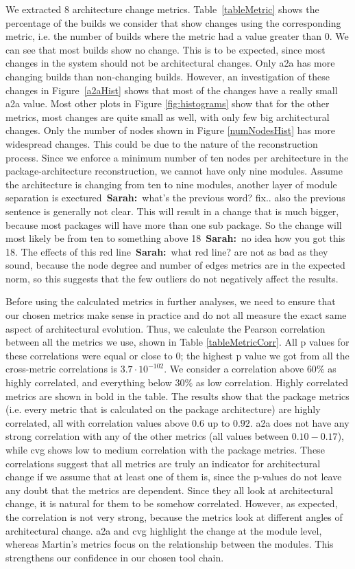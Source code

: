 \documentclass[sigplan, anonymous, review]{acmart}
\newcommand{\sn}[1]{{\color{blue}\textbf{Sarah:}~#1}}
\begin{document}
We extracted 8 architecture change metrics. 
Table~\ref{tableMetric} shows the percentage of the builds we consider that show changes using the corresponding metric, i.e. the number of builds where the metric had a value greater than 0.
We can see that most builds show no change.
This is to be expected, since most changes in the system should not be architectural changes. 
Only a2a has more changing builds than non-changing builds. 
However, an investigation of these changes in Figure~\ref{a2aHist} shows that most of the changes have a really small a2a value. 
Most other plots in Figure \ref{fig:histograms} show that for the other metrics, most changes are quite small as well, with only few big architectural changes. 
Only the number of nodes shown in Figure \ref{numNodesHist} has more widespread changes.
This could be due to the nature of the reconstruction process. Since we enforce a minimum number of ten nodes per architecture in the package-architecture reconstruction, we cannot have only nine modules. Assume the architecture is changing from ten to nine modules, another layer of module separation is exectured~\sn{what's the previous word? fix.. also the previous sentence is generally not clear}. This will result in a change that is much bigger, because most packages will have more than one sub package. So the change will most likely be from ten to something above 18~\sn{no idea how you got this 18}. The effects of this red line~\sn{what red line?} are not as bad as they sound, because the node degree and number of edges metrics are in the expected norm, so this suggests that the few outliers do not negatively affect the results.

Before using the calculated metrics in further analyses, we need to ensure that our chosen metrics make sense in practice and do not all measure the exact same aspect of architectural evolution. Thus, we calculate the Pearson correlation between all the metrics we use, shown in Table \ref{tableMetricCorr}. All p values for these correlations were equal or close to 0; the highest p value we got from all the cross-metric correlations is $3.7 \cdot 10^{-102}$. 
We consider a correlation above $60\%$ as highly correlated, and everything below $30\%$ as low correlation.
Highly correlated metrics are shown in bold in the table.
The results show that the package metrics (i.e. every metric that is calculated on the package architecture) are highly correlated, all with correlation values above $0.6$ up to $0.92$. a2a does not have any strong correlation with any of the other metrics (all values between $0.10-0.17$), while cvg shows low to medium correlation with the package metrics. 
These correlations suggest that all metrics are truly an indicator for architectural change if we assume that at least one of them is, since the p-values do not leave any doubt that the metrics are dependent.
 Since they all look at architectural change, it is natural for them to be somehow correlated. 
However, as expected, the correlation is not very strong, because the metrics look at different angles of architectural change.
a2a and cvg highlight the change at the module level, whereas Martin's metrics focus on the relationship between the modules. This strengthens our confidence in our chosen tool chain.
\end{document}
